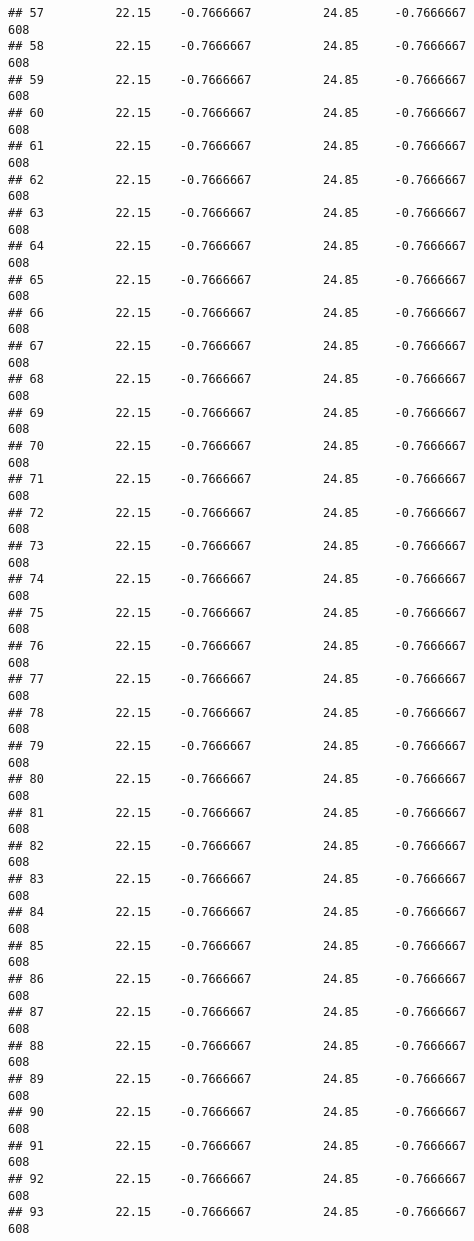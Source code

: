 \documentclass[]{article}
\begin{document}
\begin{verbatim}
## 57          22.15    -0.7666667          24.85     -0.7666667    608
## 58          22.15    -0.7666667          24.85     -0.7666667    608
## 59          22.15    -0.7666667          24.85     -0.7666667    608
## 60          22.15    -0.7666667          24.85     -0.7666667    608
## 61          22.15    -0.7666667          24.85     -0.7666667    608
## 62          22.15    -0.7666667          24.85     -0.7666667    608
## 63          22.15    -0.7666667          24.85     -0.7666667    608
## 64          22.15    -0.7666667          24.85     -0.7666667    608
## 65          22.15    -0.7666667          24.85     -0.7666667    608
## 66          22.15    -0.7666667          24.85     -0.7666667    608
## 67          22.15    -0.7666667          24.85     -0.7666667    608
## 68          22.15    -0.7666667          24.85     -0.7666667    608
## 69          22.15    -0.7666667          24.85     -0.7666667    608
## 70          22.15    -0.7666667          24.85     -0.7666667    608
## 71          22.15    -0.7666667          24.85     -0.7666667    608
## 72          22.15    -0.7666667          24.85     -0.7666667    608
## 73          22.15    -0.7666667          24.85     -0.7666667    608
## 74          22.15    -0.7666667          24.85     -0.7666667    608
## 75          22.15    -0.7666667          24.85     -0.7666667    608
## 76          22.15    -0.7666667          24.85     -0.7666667    608
## 77          22.15    -0.7666667          24.85     -0.7666667    608
## 78          22.15    -0.7666667          24.85     -0.7666667    608
## 79          22.15    -0.7666667          24.85     -0.7666667    608
## 80          22.15    -0.7666667          24.85     -0.7666667    608
## 81          22.15    -0.7666667          24.85     -0.7666667    608
## 82          22.15    -0.7666667          24.85     -0.7666667    608
## 83          22.15    -0.7666667          24.85     -0.7666667    608
## 84          22.15    -0.7666667          24.85     -0.7666667    608
## 85          22.15    -0.7666667          24.85     -0.7666667    608
## 86          22.15    -0.7666667          24.85     -0.7666667    608
## 87          22.15    -0.7666667          24.85     -0.7666667    608
## 88          22.15    -0.7666667          24.85     -0.7666667    608
## 89          22.15    -0.7666667          24.85     -0.7666667    608
## 90          22.15    -0.7666667          24.85     -0.7666667    608
## 91          22.15    -0.7666667          24.85     -0.7666667    608
## 92          22.15    -0.7666667          24.85     -0.7666667    608
## 93          22.15    -0.7666667          24.85     -0.7666667    608

\end{verbatim}
\end{document}
